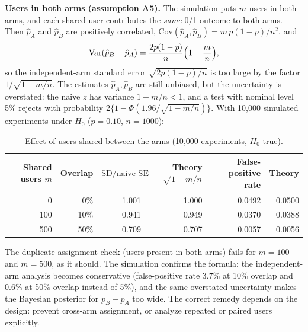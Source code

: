 \documentclass[11pt]{article}
\begin{document}
\textbf{Users in both arms (assumption A5).} The simulation puts $m$ users in both arms, and each shared user contributes the \emph{same} 0/1 outcome to both arms. Then $\hat p_A$ and $\hat p_B$ are positively correlated, $\mathrm{Cov}(\hat p_A,\hat p_B)=m\,p(1-p)/n^2$, and
\[
\mathrm{Var}(\hat p_B-\hat p_A)=\frac{2p(1-p)}{n}\Bigl(1-\frac{m}{n}\Bigr),
\]
so the independent-arm standard error $\sqrt{2p(1-p)/n}$ is too large by the factor $1/\sqrt{1-m/n}$. The estimates $\hat p_A,\hat p_B$ are still unbiased, but the uncertainty is overstated: the naive $z$ has variance $1-m/n<1$, and a test with nominal level 5\% rejects with probability $2\{1-\Phi(1.96/\sqrt{1-m/n})\}$. With 10{,}000 simulated experiments under $H_0$ ($p=0.10$, $n=1000$):
\begin{table}[H]\centering\small
\caption{Effect of users shared between the arms (10{,}000 experiments, $H_0$ true).}
\begin{tabular}{rrrrrr}\toprule
Shared users $m$ & Overlap & $\mathrm{SD}/\text{naive SE}$ & Theory $\sqrt{1-m/n}$ & False-positive rate & Theory\\\midrule
0 & 0\% & 1.001 & 1.000 & 0.0492 & 0.0500\\
100 & 10\% & 0.941 & 0.949 & 0.0370 & 0.0388\\
500 & 50\% & 0.709 & 0.707 & 0.0057 & 0.0056\\\bottomrule
\end{tabular}
\end{table}
The duplicate-assignment check (users present in both arms) fails for $m=100$ and $m=500$, as it should. The simulation confirms the formula: the independent-arm analysis becomes conservative (false-positive rate 3.7\% at 10\% overlap and 0.6\% at 50\% overlap instead of 5\%), and the same overstated uncertainty makes the Bayesian posterior for $p_B-p_A$ too wide. The correct remedy depends on the design: prevent cross-arm assignment, or analyze repeated or paired users explicitly.
\end{document}
